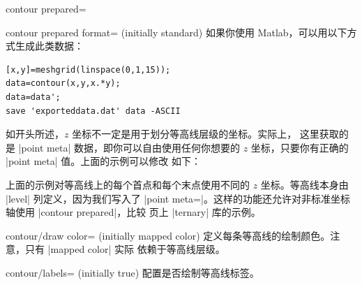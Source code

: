 {{\begin{plottype}[/pgfplots]{contour prepared=\textcolor{black}{}}
\begin{pgfplotskey}{contour prepared format= (initially standard)}
        如果你使用 Matlab，可以用以下方式生成此类数据：
\begin{verbatim}
[x,y]=meshgrid(linspace(0,1,15));
data=contour(x,y,x.*y);
data=data';
save 'exporteddata.dat' data -ASCII
\end{verbatim}
    \end{pgfplotskey}

    如开头所述，$z$ 坐标不一定是用于划分等高线层级的坐标。实际上，
    这里获取的是 |point meta| 数据，即你可以自由使用任何你想要的
    $z$ 坐标，只要你有正确的 |point meta| 值。上面的示例可以修改
    如下：
\begin{codeexample}[]
\end{codeexample}
    \noindent 上面的示例对等高线上的每个首点和每个末点使用不同的
    $z$ 坐标。等高线本身由 |level| 列定义，因为我们写入了
    |point meta=|。这样的功能还允许对非标准坐标轴使用
    |contour prepared|，比较 \pageref{page:ternary:contour} 页上
    |ternary| 库的示例。

    \begin{pgfplotskey}{contour/draw color= (initially mapped color)}
        定义每条等高线的绘制颜色。注意，只有 |mapped color| 实际
        依赖于等高线层级。
    \end{pgfplotskey}

    \begin{pgfplotskey}{contour/labels= (initially true)}
        配置是否绘制等高线标签。
    \end{pgfplotskey}


\end{plottype}}}
